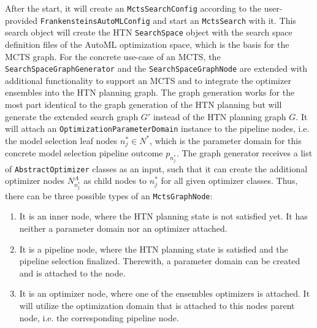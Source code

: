After the start, it will create an \texttt{MctsSearchConfig} according to the user-provided \texttt{FrankensteinsAutoMLConfig} and start an \texttt{MctsSearch} with it.
This search object will create the HTN \texttt{SearchSpace} object with the search space definition files of the AutoML optimization space, which is the basis for the MCTS graph.\newline
For the concrete use-case of an MCTS, the \texttt{SearchSpaceGraphGenerator} and the \texttt{SearchSpaceGraphNode} are extended with additional functionality to support an MCTS and to integrate the optimizer ensembles into the HTN planning graph.
The graph generation works for the most part identical to the graph generation of the HTN planning but will generate the extended search graph $G'$ instead of the HTN planning graph $G$.
It will attach an \texttt{OptimizationParameterDomain} instance to the pipeline nodes, i.e. the model selection leaf nodes $n^*_j \in N^*$, which is the parameter domain for this concrete model selection pipeline outcome $p_{n^*_j}$.
The graph generator receives a list of \texttt{AbstractOptimizer} classes as an input, such that it can create the additional optimizer nodes $N^A_{n^*_j}$ as child nodes to $n^*_j$ for all given optimizer classes.\newline
Thus, there can be three possible types of an \texttt{MctsGraphNode}:
\begin{enumerate}
    \item It is an inner node, where the HTN planning state is not satisfied yet. It has neither a parameter domain nor an optimizer attached.
    \item It is a pipeline node, where the HTN planning state is satisfied and the pipeline selection finalized. Therewith, a parameter domain can be created and is attached to the node.
    \item It is an optimizer node, where one of the ensembles optimizers is attached. It will utilize the optimization domain that is attached to this nodes parent node, i.e. the corresponding pipeline node.
\end{enumerate}

